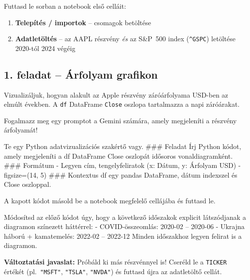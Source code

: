 \documentclass[11pt,a4paper]{article}
\newcommand{\note}[1]{%
  \vspace{3pt}%
  \begin{tcolorbox}[notestyle]%
  \textbf{\textcolor{noteborder}{Változtatási javaslat:}} #1%
  \end{tcolorbox}\vspace{2pt}}
\newcommand{\lbl}[1]{\vspace{6pt}\noindent{\small\bfseries\textcolor{labelcolor}{#1}}\par\smallskip}
\begin{document}
\noindent Futtasd le sorban a notebook első celláit:

\begin{enumerate}[noitemsep, topsep=4pt]
  \item \textbf{Telepítés / importok} -- csomagok betöltése
  \item \textbf{Adatletöltés} -- az AAPL részvény \textit{és} az S\&P~500 index (\texttt{\^{}GSPC}) letöltése 2020-tól 2024 végéig
\end{enumerate}

\bigskip

\subsection{1. feladat -- Árfolyam grafikon}

\noindent Vizualizáljuk, hogyan alakult az Apple részvény záróárfolyama USD-ben
az elmúlt években. A \texttt{df} DataFrame \texttt{Close} oszlopa tartalmazza
a napi záróárakat.

\bigskip

\lbl{Feladat:}
Fogalmazz meg egy promptot a Gemini számára, amely megjeleníti a részvény árfolyamát!

\begin{prompt}
Te egy Python adatvizualizációs szakértő vagy.
### Feladat
Írj Python kódot, amely megjeleníti a df DataFrame Close oszlopát
idősoros vonaldiagramként.
### Formátum
- Legyen cím, tengelyfeliratok (x: Dátum, y: Árfolyam USD)
- figsize=(14, 5)
### Kontextus
df egy pandas DataFrame, dátum indexszel és Close oszloppal.
\end{prompt}

\noindent A kapott kódot másold be a notebook megfelelő cellájába és futtasd le.

\medskip\lbl{Módosítás -- jelöld meg a fontos időszakokat!}

\begin{prompt}
Módosítsd az előző kódot úgy, hogy a következő időszakok
explicit látszódjanak a diagramon színezett háttérrel:
- COVID-összeomlás: 2020-02 -- 2020-06
- Ukrajna háború + kamatemelés: 2022-02 -- 2022-12
Minden időszakhoz legyen felirat is a diagramon.
\end{prompt}

\note{Próbáld ki más részvénnyel is! Cseréld le a \texttt{TICKER} értékét
(pl.\ \texttt{"MSFT"}, \texttt{"TSLA"}, \texttt{"NVDA"}) és futtasd újra
az adatletöltő cellát.}
\end{document}

